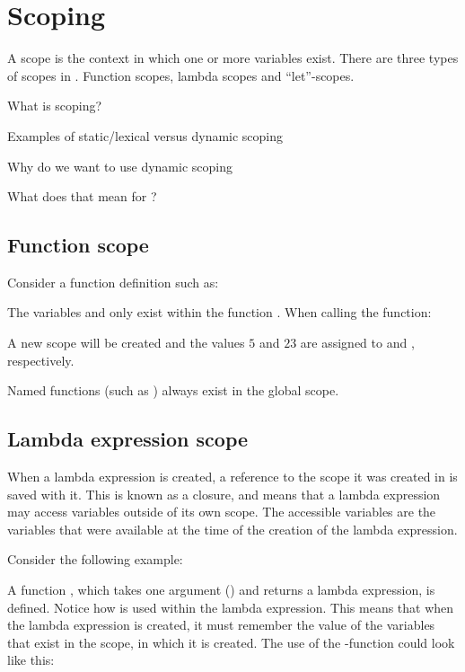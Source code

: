 \section{Scoping}
\label{sec:scoping}

A scope is the context in which one or more variables exist.
There are three types of scopes in \productname{}. Function scopes, lambda scopes and
``let''-scopes.

\begin{dlist}
\item What is scoping?
\item Examples of static/lexical versus dynamic scoping
\item Why do we want to use dynamic scoping
\item What does that mean for \productname?
\end{dlist}

\subsection{Function scope}
Consider a function definition such as:


The variables  and  only exist within the function .
When calling the function:


A new scope will be created and the values $5$ and $23$
are assigned to  and , respectively.

Named functions (such as ) always exist in the global scope.

\subsection{Lambda expression scope}

When a lambda expression is created, a reference to the scope it was created
in is saved with it. This is known as a closure, and means that a lambda
expression may access variables outside of its own scope. The accessible
variables are the variables that were available at the time of the creation
of the lambda expression.

Consider the following example:


A function , which takes one argument () and
returns a lambda expression, is defined. Notice how  is used within
the lambda expression. This means that when the lambda expression is created, it
must remember the value of the variables that exist in the scope, in which it is
created. The use of the -function could look like this:

